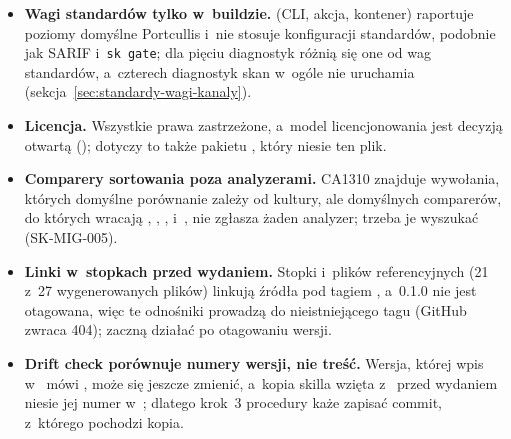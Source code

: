 \begin{itemize}
        zachowania ma je weryfikować replay i~porównanie Second Key.
  \item \textbf{Wagi standardów tylko w~buildzie.}  (CLI, akcja,
        kontener) raportuje poziomy domyślne Portcullis i~nie stosuje konfiguracji standardów,
        podobnie jak SARIF i~\texttt{sk gate}; dla pięciu diagnostyk różnią się one od wag
        standardów, a~czterech diagnostyk  skan w~ogóle nie uruchamia
        (sekcja~\ref{sec:standardy-wagi-kanaly}).
  \item \textbf{Licencja.} Wszystkie prawa zastrzeżone, a~model licencjonowania jest decyzją
        otwartą (); dotyczy to także pakietu ,
        który niesie ten plik.
  \item \textbf{Comparery sortowania poza analyzerami.} CA1310 znajduje wywołania, których
        domyślne porównanie zależy od kultury, ale domyślnych comparerów, do których wracają
        , , ,
         i~, nie zgłasza żaden analyzer;
        trzeba je wyszukać (SK-MIG-005).
  \item \textbf{Linki w~stopkach przed wydaniem.} Stopki  i~plików
        referencyjnych (21 z~27 wygenerowanych plików) linkują źródła pod tagiem
        , a~0.1.0 nie jest otagowana, więc te odnośniki prowadzą
        do nieistniejącego tagu (GitHub zwraca 404); zaczną działać po otagowaniu wersji.
  \item \textbf{Drift check porównuje numery wersji, nie treść.} Wersja, której wpis
        w~ mówi , może się jeszcze zmienić, a~kopia
        skilla wzięta z~ przed wydaniem niesie jej numer
        w~; dlatego krok~3 procedury każe zapisać commit,
        z~którego pochodzi kopia.
\end{itemize}

